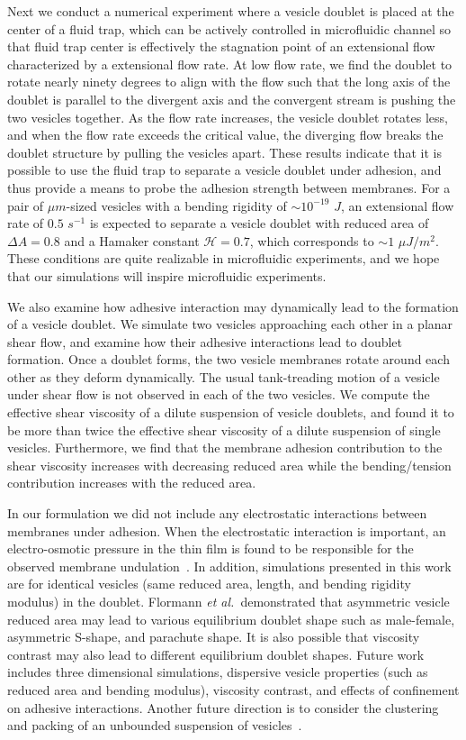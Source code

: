 \documentclass[prf,superscriptaddress,showkeys,longbibliography]{revtex4-1}
\begin{document}
Next we conduct a numerical experiment where a vesicle doublet is placed
at the center of a fluid trap, which can be actively controlled in
microfluidic channel so that fluid trap center is effectively the
stagnation point of an extensional flow characterized by a extensional
flow rate.  At low flow rate, we find the doublet to rotate nearly
ninety degrees to align with the flow such that the long axis of the
doublet is parallel to the divergent axis and the convergent stream is
pushing the two vesicles together. As the flow rate increases, the
vesicle doublet rotates less, and when the flow rate exceeds the
critical value, the diverging flow breaks the doublet structure by
pulling the vesicles apart.  These results indicate that it is possible
to use the fluid trap to separate a vesicle doublet under adhesion, and
thus provide a means to probe the adhesion strength between membranes.
For a pair of $\mu m$-sized vesicles with a bending rigidity of $\sim
10^{-19}$ $J$, an extensional flow rate of $0.5$ $s^{-1}$ is expected to
separate a vesicle doublet with reduced area of $\Delta A = 0.8$ and a
Hamaker constant $\mathcal{H}=0.7$, which corresponds to $\sim 1$ $\mu
J/m^2$.  These conditions are quite realizable in microfluidic
experiments, and we hope that our simulations will inspire microfluidic
experiments.

We also examine how adhesive interaction may dynamically lead to the
formation of a vesicle doublet.  We simulate two vesicles approaching
each other in a planar shear flow, and examine how their adhesive
interactions lead to doublet formation.  Once a doublet forms, the two
vesicle membranes rotate around each other as they deform dynamically.
The usual tank-treading motion of a vesicle under shear flow is not
observed in each of the two vesicles. We compute the effective shear
viscosity of a dilute suspension of vesicle doublets, and found it to be
more than twice the effective shear viscosity of a dilute suspension of
single vesicles.  Furthermore, we find that the membrane adhesion
contribution to the shear viscosity increases with decreasing reduced
area while the bending/tension contribution increases with the reduced
area.

In our formulation we did not include any electrostatic interactions
between membranes under adhesion. When the electrostatic interaction is
important, an electro-osmotic pressure in the thin film is found to be
responsible for the observed membrane
undulation~\cite{SteinkuhlerAgudo-Canalejo2016_BJ}.  In addition,
simulations presented in this work are for identical vesicles (same
reduced area, length, and bending rigidity modulus) in the doublet.
Flormann {\em et al.}~demonstrated that asymmetric vesicle reduced area
may lead to various equilibrium doublet shape such as male-female,
asymmetric S-shape, and parachute shape.  It is also possible that
viscosity contrast may also lead to different equilibrium doublet
shapes.  Future work includes three dimensional simulations, dispersive
vesicle properties (such as reduced area and bending modulus), viscosity
contrast, and effects of confinement on adhesive interactions.  Another
future direction is to consider the clustering and packing of an
unbounded suspension of vesicles~\cite{FlormannAouane2017_SciReports}.
\end{document}
